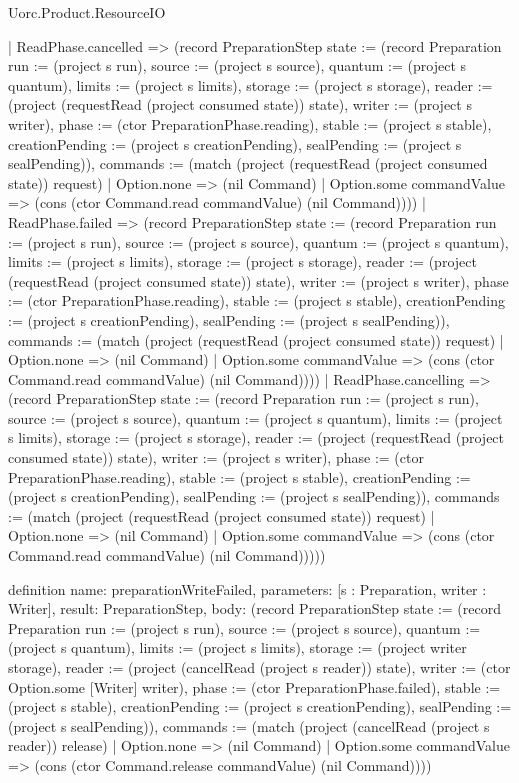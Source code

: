 \begin{lexlean}{Uorc.Product.ResourceIO}
\begin{semanticmodule}
{    | ReadPhase.cancelled => (record PreparationStep {state := (record Preparation {run := (project s run), source := (project s source), quantum := (project s quantum), limits := (project s limits), storage := (project s storage), reader := (project (requestRead (project consumed state)) state), writer := (project s writer), phase := (ctor PreparationPhase.reading), stable := (project s stable), creationPending := (project s creationPending), sealPending := (project s sealPending)}), commands := (match (project (requestRead (project consumed state)) request)
      | Option.none => (nil Command)
      | Option.some commandValue => (cons (ctor Command.read commandValue) (nil Command)))})
    | ReadPhase.failed => (record PreparationStep {state := (record Preparation {run := (project s run), source := (project s source), quantum := (project s quantum), limits := (project s limits), storage := (project s storage), reader := (project (requestRead (project consumed state)) state), writer := (project s writer), phase := (ctor PreparationPhase.reading), stable := (project s stable), creationPending := (project s creationPending), sealPending := (project s sealPending)}), commands := (match (project (requestRead (project consumed state)) request)
      | Option.none => (nil Command)
      | Option.some commandValue => (cons (ctor Command.read commandValue) (nil Command)))})
    | ReadPhase.cancelling => (record PreparationStep {state := (record Preparation {run := (project s run), source := (project s source), quantum := (project s quantum), limits := (project s limits), storage := (project s storage), reader := (project (requestRead (project consumed state)) state), writer := (project s writer), phase := (ctor PreparationPhase.reading), stable := (project s stable), creationPending := (project s creationPending), sealPending := (project s sealPending)}), commands := (match (project (requestRead (project consumed state)) request)
      | Option.none => (nil Command)
      | Option.some commandValue => (cons (ctor Command.read commandValue) (nil Command)))}))
}

definition{
  name: preparationWriteFailed,
  parameters: [s : Preparation, writer : Writer],
  result: PreparationStep,
  body: (record PreparationStep {state := (record Preparation {run := (project s run), source := (project s source), quantum := (project s quantum), limits := (project s limits), storage := (project writer storage), reader := (project (cancelRead (project s reader)) state), writer := (ctor Option.some [Writer] writer), phase := (ctor PreparationPhase.failed), stable := (project s stable), creationPending := (project s creationPending), sealPending := (project s sealPending)}), commands := (match (project (cancelRead (project s reader)) release)
    | Option.none => (nil Command)
    | Option.some commandValue => (cons (ctor Command.release commandValue) (nil Command)))})
}


\end{semanticmodule}
\end{lexlean}
